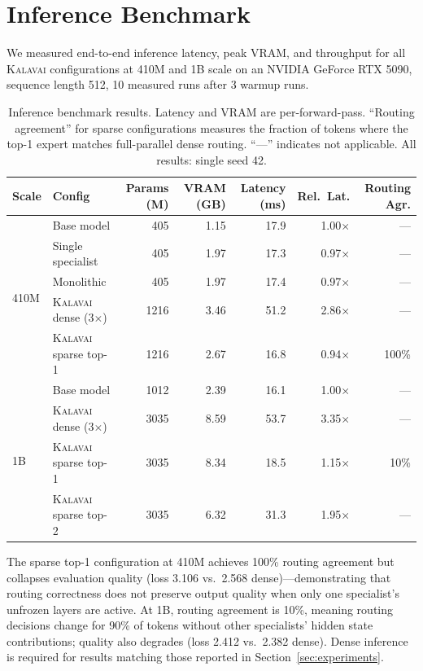 \documentclass{article}
\newcommand{\kalavai}{\textsc{Kalavai}\xspace}
\begin{document}
\section{Inference Benchmark}
\label{app:inference}

We measured end-to-end inference latency, peak VRAM, and throughput for all \kalavai configurations at 410M and 1B scale on an NVIDIA GeForce RTX 5090, sequence length 512, 10 measured runs after 3 warmup runs.

\begin{table}[h]
\centering
\caption{Inference benchmark results. Latency and VRAM are per-forward-pass. ``Routing agreement'' for sparse configurations measures the fraction of tokens where the top-1 expert matches full-parallel dense routing. ``---'' indicates not applicable. All results: single seed 42.}
\label{tab:inferencebench}
\small
\begin{tabular}{llrrrrr}
\toprule
\textbf{Scale} & \textbf{Config} & \textbf{Params (M)} & \textbf{VRAM (GB)} & \textbf{Latency (ms)} & \textbf{Rel.\ Lat.} & \textbf{Routing Agr.} \\
\midrule
\multirow{5}{*}{410M}
 & Base model          & 405  & 1.15 & 17.9 & 1.00$\times$ & --- \\
 & Single specialist   & 405  & 1.97 & 17.3 & 0.97$\times$ & --- \\
 & Monolithic          & 405  & 1.97 & 17.4 & 0.97$\times$ & --- \\
 & \kalavai dense (3$\times$) & 1216 & 3.46 & 51.2 & 2.86$\times$ & --- \\
 & \kalavai sparse top-1 & 1216 & 2.67 & 16.8 & 0.94$\times$ & 100\% \\
\midrule
\multirow{4}{*}{1B}
 & Base model          & 1012 & 2.39 & 16.1 & 1.00$\times$ & --- \\
 & \kalavai dense (3$\times$) & 3035 & 8.59 & 53.7 & 3.35$\times$ & --- \\
 & \kalavai sparse top-1 & 3035 & 8.34 & 18.5 & 1.15$\times$ & 10\% \\
 & \kalavai sparse top-2 & 3035 & 6.32 & 31.3 & 1.95$\times$ & --- \\
\bottomrule
\end{tabular}
\end{table}

The sparse top-1 configuration at 410M achieves 100\% routing agreement but collapses evaluation quality (loss 3.106 vs.\ 2.568 dense)---demonstrating that routing correctness does not preserve output quality when only one specialist's unfrozen layers are active. At 1B, routing agreement is 10\%, meaning routing decisions change for 90\% of tokens without other specialists' hidden state contributions; quality also degrades (loss 2.412 vs.\ 2.382 dense). Dense inference is required for results matching those reported in Section~\ref{sec:experiments}.
\end{document}
